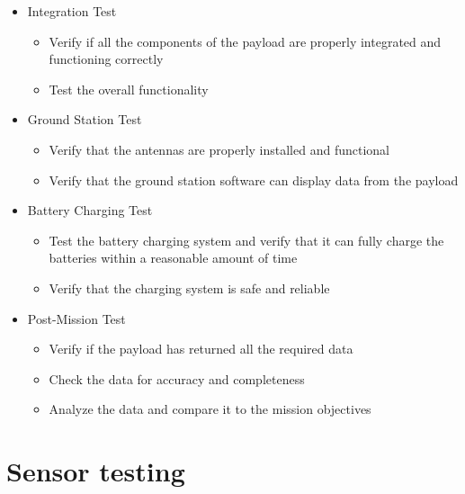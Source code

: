 \documentclass[11pt]{article}
\begin{document}
\begin{itemize}[leftmargin=1cm, itemindent=0.25cm, noitemsep, topsep=0pt, label=]
\item Integration Test
\begin{itemize}[label=, noitemsep, topsep=2pt]
\item Verify if all the components of the payload are properly integrated and functioning correctly
\item Test the overall functionality
\end{itemize}

\item Ground Station Test
\begin{itemize}[label=, noitemsep, topsep=2pt]
\item Verify that the antennas are properly installed and functional
\item Verify that the ground station software can display data from the payload
\end{itemize}

\item Battery Charging Test
\begin{itemize}[label=, noitemsep, topsep=2pt]
\item Test the battery charging system and verify that it can fully charge the batteries within a reasonable amount of time
\item Verify that the charging system is safe and reliable
\end{itemize}

\item Post-Mission Test
\begin{itemize}[label=, noitemsep, topsep=2pt]
\item Verify if the payload has returned all the required data
\item Check the data for accuracy and completeness
\item Analyze the data and compare it to the mission objectives
\end{itemize}

\end{itemize}


\section{Sensor testing}\label{A22}
\end{document}
